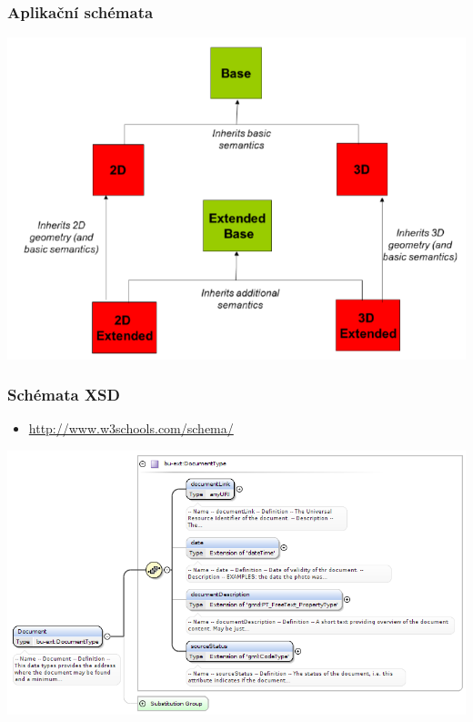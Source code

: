 \begin{frame}
\frametitle{Aplikační schémata}
\begin{center}
\includegraphics[scale=0.4]{obrazky/app_schema.png}
\end{center}
\end{frame}

\begin{frame}
\frametitle{Schémata XSD}
\begin{itemize}
\item \url{http://www.w3schools.com/schema/}
\end{itemize}
\begin{center}
\includegraphics[scale=0.3]{obrazky/XSD.png}
\end{center}
\end{frame}

